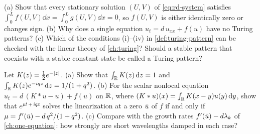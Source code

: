 \begin{exercise}\label{exer:outlook-definition}
(a) Show that every stationary solution $(U,V)$ of \eqref{eq:rd-system} satisfies
$\int_0^Lf(U,V)\dd x=\int_0^Lg(U,V)\dd x=0$, so $f(U,V)$ is either identically zero
or changes sign. (b) Why does a single equation $u_t=d\,u_{xx}+f(u)$ have no Turing
patterns? (c) Which of the conditions (i)--(iv) in \cref{def:turing-pattern} can be
checked with the linear theory of \cref{ch:turing}? Should a stable pattern that
coexists with a stable constant state be called a Turing pattern?
\end{exercise}

\begin{exercise}\label{exer:outlook-nonlocal}
Let $K(z)=\tfrac12e^{-\left\lvert z\right\rvert}$. (a) Show that $\int_{\mathbb{R}}K(z)\,\mathrm{d} z=1$ and
$\int_{\mathbb{R}}K(z)e^{-iqz}\,\mathrm{d} z=1/(1+q^2)$. (b) For the scalar nonlocal equation
$u_t=d\,(K*u-u)+f(u)$ on $\mathbb{R}$, where $(K*u)(x)=\int_{\mathbb{R}}K(x-y)u(y)\,\mathrm{d} y$, show that
$e^{\mu t+iqx}$ solves the linearization at a zero $\bar u$ of $f$ if and only if
$\mu=f'(\bar u)-d\,q^2/(1+q^2)$. (c) Compare with the growth rates
$f'(\bar u)-d\lambda_k$ of \cref{ch:one-equation}: how strongly are short wavelengths
damped in each case?
\end{exercise}